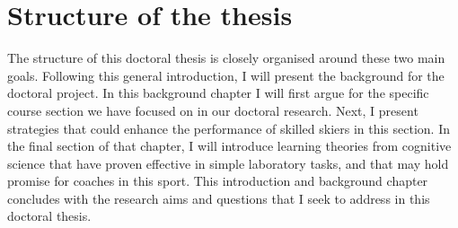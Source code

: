 

\section{Structure of the thesis}
The structure of this doctoral thesis is closely organised around these two main goals. Following this general introduction, I will present the background for the doctoral project. In this background chapter I will first argue for the specific course section we have focused on in our doctoral research. Next, I present strategies that could enhance the performance of skilled skiers in this section. In the final section of that chapter, I will introduce learning theories from cognitive science that have proven effective in simple laboratory tasks, and that may hold promise for coaches in this sport. This introduction and background chapter concludes with the research aims and questions that I seek to address in this doctoral thesis. 

